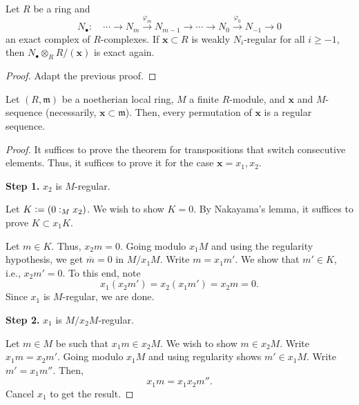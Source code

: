 \documentclass[12pt]{article}
\begin{document}
\begin{prop} \label{prop:regular-sequence-tensor-strong}
	Let $R$ be a ring and
	\begin{equation*} 
		N_{\bullet} : \quad \cdots \to N_{m} \xrightarrow{\varphi_{m}} N_{m - 1} \to \cdots \to N_{0} \xrightarrow{\varphi_{0}} N_{-1} \to 0
	\end{equation*}
	an exact complex of $R$-complexes. If $\mathbf{x} \subset R$ is weakly $N_{i}$-regular for all $i \ge -1$, then $N_{\bullet} \otimes_{R} R/(\mathbf{x})$ is exact again.
\end{prop}
\begin{proof} 
	Adapt the previous proof.
\end{proof}

\begin{prop}
	Let $(R, \mathfrak{m})$ be a noetherian local ring, $M$ a finite $R$-module, and $\mathbf{x}$ and $M$-sequence (necessarily, $\mathbf{x} \subset \mathfrak{m}$). Then, every permutation of $\mathbf{x}$ is a regular sequence.
\end{prop}
\begin{proof} 
	It suffices to prove the theorem for transpositions that switch consecutive elements. Thus, it suffices to prove it for the case $\mathbf{x} = x_{1}, x_{2}$.

	\textbf{Step 1.} $x_{2}$ is $M$-regular.

	Let $K \vcentcolon= (0 :_{M} x_{2})$. We wish to show $K = 0$. By Nakayama's lemma, it suffices to prove $K \subset x_{1} K$. 

	Let $m \in K$. Thus, $x_{2} m = 0$. Going modulo $x_{1} M$ and using the regularity hypothesis, we get $\overline{m} = 0$ in $M/x_{1} M$. Write $m = x_{1} m'$. We show that $m' \in K$, i.e., $x_{2} m' = 0$. To this end, note
	\begin{equation*} 
		x_{1}(x_{2} m') = x_{2}(x_{1} m') = x_{2} m = 0.
	\end{equation*}
	Since $x_{1}$ is $M$-regular, we are done.

	\textbf{Step 2.} $x_{1}$ is $M/x_{2} M$-regular.

	Let $m \in M$ be such that $x_{1} m \in x_{2} M$. We wish to show $m \in x_{2} M$. \newline
	Write $x_{1} m = x_{2} m'$. Going modulo $x_{1} M$ and using regularity shows $m' \in x_{1} M$. Write $m' = x_{1} m''$. Then,
	\begin{equation*} 
		x_{1} m = x_{1} x_{2} m''.
	\end{equation*}
	Cancel $x_{1}$ to get the result.
\end{proof}
\end{document}
